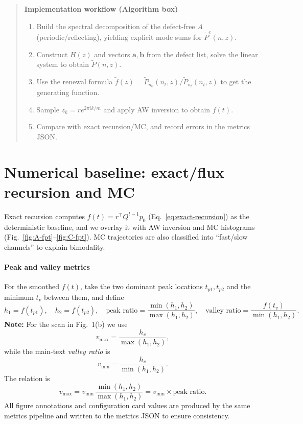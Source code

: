 \documentclass[11pt]{article}
\begin{document}
\begin{quote}
\textbf{Implementation workflow (Algorithm box)}
\begin{enumerate}[leftmargin=*, itemsep=0pt]
  \item Build the spectral decomposition of the defect-free $A$ (periodic/reflecting), yielding explicit mode sums for $\tilde P^e(n,z)$.
  \item Construct $H(z)$ and vectors $\mathbf{a},\mathbf{b}$ from the defect list, solve the linear system to obtain $\tilde P(n,z)$.
  \item Use the renewal formula $\tilde f(z)=\tilde P_{n_0}(n_t,z)/\tilde P_{n_t}(n_t,z)$ to get the generating function.
  \item Sample $z_k=r e^{2\pi i k/m}$ and apply AW inversion to obtain $f(t)$.
  \item Compare with exact recursion/MC, and record errors in the metrics JSON.
\end{enumerate}
\end{quote}

\section{Numerical baseline: exact/flux recursion and MC}
Exact recursion computes $f(t)=r^\top Q^{t-1} p_0$ (Eq.~\ref{eq:exact-recursion}) as the deterministic baseline, and we overlay it with AW inversion and MC histograms (Fig.~\ref{fig:A-fpt}--\ref{fig:C-fpt}). MC trajectories are also classified into ``fast/slow channels'' to explain bimodality.

\paragraph{Peak and valley metrics}
For the smoothed $f(t)$, take the two dominant peak locations $t_{p1},t_{p2}$ and the minimum $t_v$ between them, and define
\begin{equation}
  h_1=f(t_{p1}),\quad h_2=f(t_{p2}),\quad
  \text{peak ratio}=\frac{\min(h_1,h_2)}{\max(h_1,h_2)},\quad
  \text{valley ratio}=\frac{f(t_v)}{\min(h_1,h_2)}.
\end{equation}
\noindent\textbf{Note:} For the scan in Fig.~1(b) we use
\[
  v_{\max}=\frac{h_v}{\max(h_1,h_2)},
\]
while the main-text \emph{valley ratio} is
\[
  v_{\min}=\frac{h_v}{\min(h_1,h_2)}.
\]
The relation is
\[
  v_{\max}=v_{\min}\,\frac{\min(h_1,h_2)}{\max(h_1,h_2)}
  =v_{\min}\times \text{peak ratio}.
\]
All figure annotations and configuration card values are produced by the same metrics pipeline and written to the metrics JSON to ensure consistency.
\end{document}
